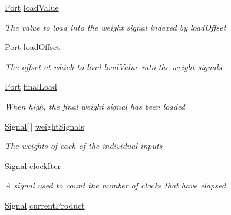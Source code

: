 \begin{DoxyCompactItemize}
\hyperlink{class_n_n_gen_1_1_port}{Port} \hyperlink{class_n_n_gen_1_1_sync_neuron_a4334c7219b366b989108a9451ff3c409}{load\+Value}
\begin{DoxyCompactList}\small\item\em The value to load into the weight signal indexed by load\+Offset \end{DoxyCompactList}\item 
\hyperlink{class_n_n_gen_1_1_port}{Port} \hyperlink{class_n_n_gen_1_1_sync_neuron_a1ad5ac56ac0278154e84eeeb4ae09604}{load\+Offset}
\begin{DoxyCompactList}\small\item\em The offset at which to load load\+Value into the weight signals \end{DoxyCompactList}\item 
\hyperlink{class_n_n_gen_1_1_port}{Port} \hyperlink{class_n_n_gen_1_1_sync_neuron_a871ce93f3b672a3425fec4ee5d55a5d5}{final\+Load}
\begin{DoxyCompactList}\small\item\em When high, the final weight signal has been loaded \end{DoxyCompactList}\item 
\hyperlink{class_n_n_gen_1_1_signal}{Signal}\mbox{[}$\,$\mbox{]} \hyperlink{class_n_n_gen_1_1_sync_neuron_a1d9363beee9303179a0f47c0f143f97a}{weight\+Signals}
\begin{DoxyCompactList}\small\item\em The weights of each of the individual inputs \end{DoxyCompactList}\item 
\hyperlink{class_n_n_gen_1_1_signal}{Signal} \hyperlink{class_n_n_gen_1_1_sync_neuron_a7903497d879961c468b41d704fc6e110}{clock\+Iter}
\begin{DoxyCompactList}\small\item\em A signal used to count the number of clocks that have elapsed \end{DoxyCompactList}\item 
\hyperlink{class_n_n_gen_1_1_signal}{Signal} \hyperlink{class_n_n_gen_1_1_sync_neuron_a3eb9c8d040a716f504bfb373bc17eabf}{current\+Product}

\end{DoxyCompactItemize}
